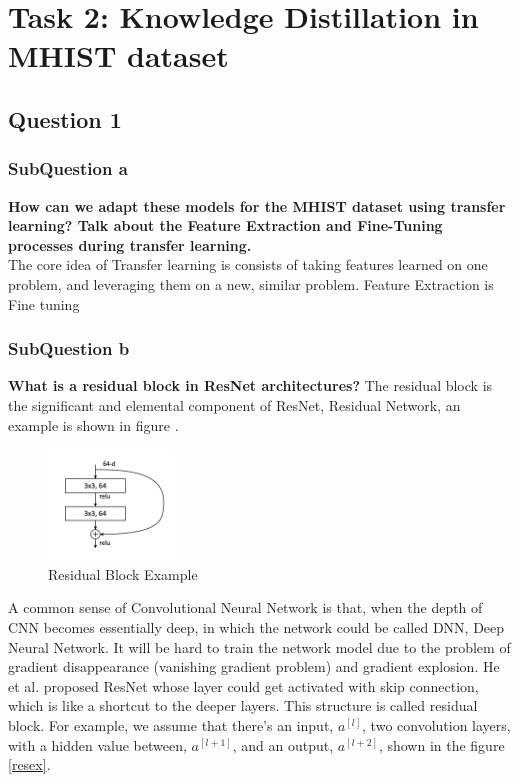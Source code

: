 \documentclass[conference]{IEEEtran}
\begin{document}
\section{Task 2: Knowledge Distillation in MHIST dataset}

\subsection{Question 1}
\subsubsection{SubQuestion a} \textbf{How can we adapt these models for the MHIST dataset using transfer learning? Talk about the Feature Extraction and Fine-Tuning processes during transfer learning.}\\

The core idea of Transfer learning is consists of taking features learned on one problem, and leveraging them on a new, similar problem.\cite{keras}
Feature Extraction is 
\\
Fine tuning
\cite{blog}
\subsubsection{SubQuestion b} \textbf{What is a residual block in ResNet architectures?}
The residual block is the significant and elemental component of ResNet, Residual Network, an example is shown in figure \label{res}.

\begin{figure}[h] 
    \centering
    \includegraphics[width=0.3\textwidth]{./graphs/Task2/res-block.png}
    \caption{Residual Block Example}
    \label{res}
\end{figure}

A common sense of Convolutional Neural Network is that, when the depth of CNN becomes essentially deep, in which the network could be called DNN, Deep Neural Network. It will be hard to train the network model due to the problem of gradient disappearance (vanishing gradient problem) and gradient explosion. He et al.\cite{resnet} proposed ResNet whose layer could get activated with skip connection, which is like a shortcut to the deeper layers. This structure is called residual block. For example, we assume that there's an input, $a^{[l]}$, two convolution layers, with a hidden value between, $a^{[l+1]}$, and an output, $a^{[l+2]}$, shown in the figure \ref{resex}\cite{wu}.
\end{document}

